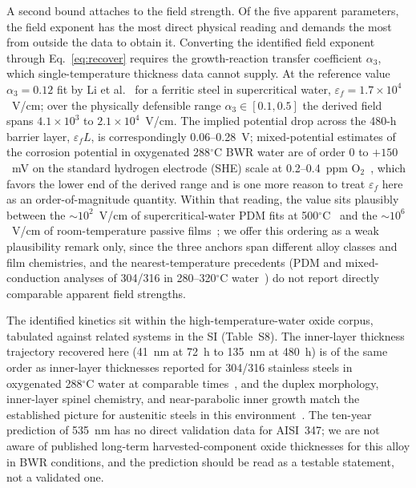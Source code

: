 \documentclass[pdflatex,sn-nature]{sn-jnl}
\begin{document}
A second bound attaches to the field strength. Of the five apparent
parameters, the field exponent has the most direct physical reading and
demands the most from outside the data to obtain it. Converting the identified field exponent through
Eq.~\eqref{eq:recover} requires the growth-reaction transfer
coefficient $\alpha_3$, which single-temperature thickness data cannot
supply. At the reference value $\alpha_3 = 0.12$ fit by Li et
al.~\citep{li2020scwpdm} for a ferritic steel in supercritical water,
$\varepsilon_f = 1.7\times10^4$~V/cm; over the physically defensible
range $\alpha_3 \in [0.1, 0.5]$ the derived field spans
$4.1\times10^3$ to $2.1\times10^4$~V/cm. The implied potential drop
across the 480-h barrier layer, $\varepsilon_f L$, is correspondingly
0.06--0.28~V; mixed-potential estimates of the corrosion potential in
oxygenated 288$^\circ$C BWR water are of order 0 to
$+150$~mV on the standard hydrogen electrode (SHE)
scale at 0.2--0.4~ppm
O$_2$~\citep{macdonald1992hwc,lin1996ecp}, which favors the lower end
of the derived range and is one more reason to treat $\varepsilon_f$
here as an order-of-magnitude quantity. Within that reading, the value
sits plausibly between the $\sim10^2$~V/cm of supercritical-water PDM
fits at 500$^\circ$C~\citep{li2020scwpdm} and the $\sim10^6$~V/cm of
room-temperature passive films~\citep{cabrera1949oxidation}; we offer
this ordering as a weak plausibility remark only, since the three
anchors span different alloy classes and film chemistries, and the
nearest-temperature precedents (PDM and mixed-conduction analyses of
304/316 in 280--320$^\circ$C
water~\citep{ss316l_pwr_pdm,bojinov_mcm,ss316ln_pdm2024}) do not report
directly comparable apparent field strengths.

The identified kinetics sit within the high-temperature-water oxide
corpus, tabulated against related systems in the SI (Table~S8). The inner-layer thickness
trajectory recovered here (41~nm at 72~h to 135~nm at 480~h) is of the
same order as inner-layer thicknesses reported for 304/316 stainless
steels in oxygenated 288$^\circ$C water at comparable
times~\citep{kuang2010oxidation,kim1999oxide}, and the duplex
morphology, inner-layer spinel chemistry, and near-parabolic inner
growth match the established picture for austenitic steels in this
environment~\citep{robertson1991mechanism,stellwag1998mechanism,ziemniak2002corrosion}.
The ten-year prediction of 535~nm has no direct validation data for
AISI~347; we are not aware of published long-term harvested-component
oxide thicknesses for this alloy in BWR conditions, and the prediction
should be read as a testable statement, not a validated one.
\end{document}
